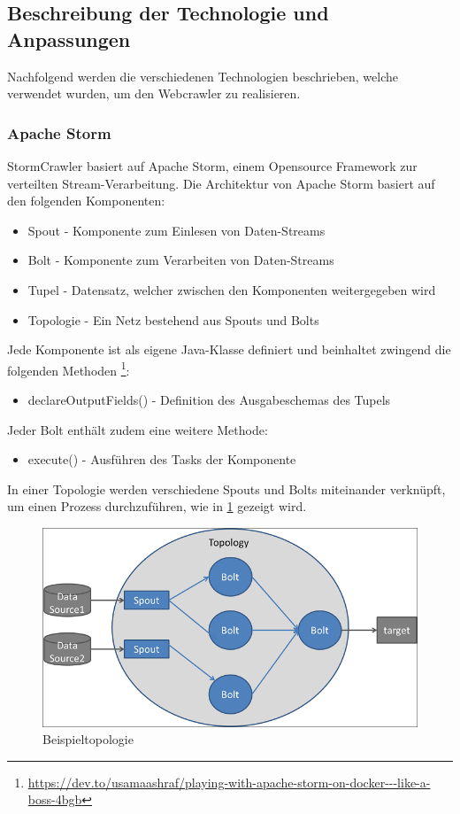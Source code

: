 \subsection{Beschreibung der Technologie und Anpassungen}
Nachfolgend werden die verschiedenen Technologien beschrieben, welche verwendet wurden, um den Webcrawler zu realisieren.
\subsubsection{Apache Storm}
StormCrawler basiert auf Apache Storm, einem Opensource Framework zur verteilten Stream-Verarbeitung.
Die Architektur von Apache Storm basiert auf den folgenden Komponenten:
\begin{itemize}
	\item Spout - Komponente zum Einlesen von Daten-Streams
	\item Bolt - Komponente zum Verarbeiten von Daten-Streams
	\item Tupel - Datensatz, welcher zwischen den Komponenten weitergegeben wird
	\item Topologie - Ein Netz bestehend aus Spouts und Bolts
\end{itemize}
Jede Komponente ist als eigene Java-Klasse definiert und beinhaltet zwingend die folgenden Methoden \footnote{\url{https://dev.to/usamaashraf/playing-with-apache-storm-on-docker---like-a-boss-4bgb}}:
\begin{itemize}
	\item declareOutputFields() - Definition des Ausgabeschemas des Tupels
\end{itemize}
Jeder Bolt enthält zudem eine weitere Methode:
\begin{itemize}
	\item execute() - Ausführen des Tasks der Komponente
\end{itemize}
In einer Topologie werden verschiedene Spouts und Bolts miteinander verknüpft, um einen Prozess durchzuführen, wie in \cref{fig:topology} gezeigt wird.
\begin{figure}[H]
	\centering	
	\includegraphics[width=0.8\columnwidth,keepaspectratio]{img/storm-topology.png}
	\caption{Beispieltopologie}
	\label{fig:topology}
\end{figure}
